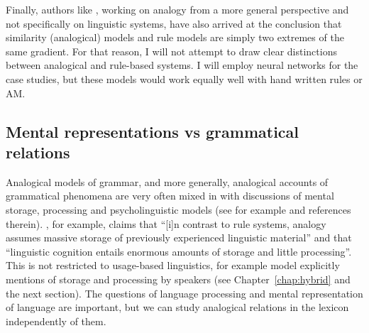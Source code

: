 Finally, authors like \textcite{Pothos.2005}, working on analogy from a more general perspective and not specifically on linguistic systems, have also arrived at the conclusion that similarity (analogical) models and rule models are simply two extremes of the same gradient. For that reason, I will not attempt to draw clear distinctions between analogical and rule-based systems. I will employ neural networks for the case studies, but these models would work equally well with hand written rules or AM.

\subsection{Mental representations vs grammatical relations}

\largerpage
Analogical models of grammar, and more generally, analogical accounts of grammatical phenomena are very often mixed in with discussions of mental storage, processing and psycholinguistic models (see for example \cite{Bybee.2010} and references therein). \textcite[419--420]{Eddington.2009}, for example, claims that ``[i]n contrast to rule systems, analogy assumes massive storage of previously experienced linguistic material'' and that ``linguistic cognition entails enormous amounts of storage and little processing''. This is not restricted to usage-based linguistics, for example  model explicitly mentions of storage and processing by speakers (see Chapter~\ref{chap:hybrid} and the next section). The questions of language processing and mental representation of language are important, but we can study analogical relations in the lexicon independently of them.

